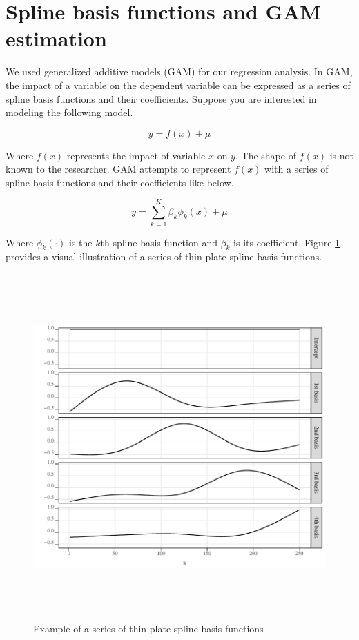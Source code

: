 \documentclass[
]{article}
\begin{document}
\clearpage

\hypertarget{spline-basis}{%
\section{Spline basis functions and GAM estimation}\label{spline-basis}}

\setcounter{figure}{0}
\renewcommand{\thefigure}{D.\arabic{figure}}

We used generalized additive models (GAM) for our regression analysis. In GAM, the impact of a variable on the dependent variable can be expressed as a series of spline basis functions and their coefficients. Suppose you are interested in modeling the following model.

\begin{equation}
y = f(x) + \mu
\end{equation}

Where \(f(x)\) represents the impact of variable \(x\) on \(y\). The shape of \(f(x)\) is not known to the researcher. GAM attempts to represent \(f(x)\) with a series of spline basis functions and their coefficients like below.

\begin{equation}
y = \sum_{k=1}^K \beta_k \phi_k(x) + \mu
\end{equation}

Where \(\phi_k(\cdot)\) is the \(k\)th spline basis function and \(\beta_k\) is its coefficient. Figure \ref{fig:sp-basis} provides a visual illustration of a series of thin-plate spline basis functions.

\begin{figure}[H]

{\centering \includegraphics[width=6in,height=500px,]{../../Figures/g_basis} 

}

\caption{Example of a series of thin-plate spline basis functions}\label{fig:sp-basis}
\end{figure}
\end{document}
